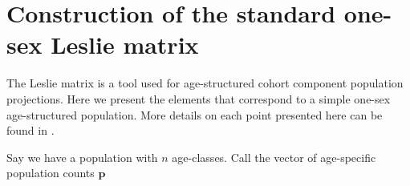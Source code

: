 \chapter{Construction of the standard one-sex Leslie matrix}
\label{Appendix:Caswell}
The Leslie matrix is a tool used for age-structured cohort component population
projections. Here we present the elements that correspond to a simple one-sex
age-structured population. More details on each point presented here can be
found in \cite{caswell2001matrix}.

Say we have a population with $n$ age-classes. Call the vector of age-specific
population counts $\textbf{p}$


